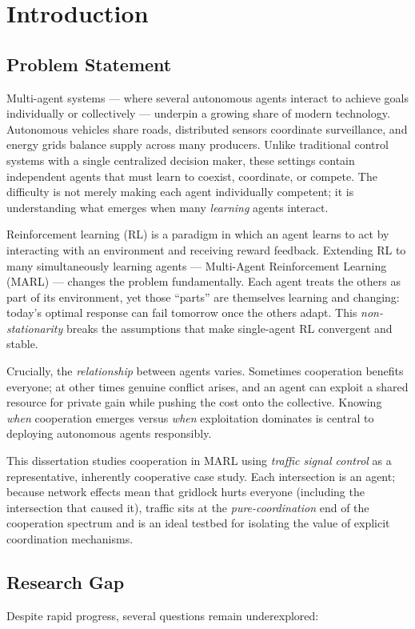\chapter{Introduction}
\label{ch:intro}

\section{Problem Statement}
Multi-agent systems --- where several autonomous agents interact to achieve goals
individually or collectively --- underpin a growing share of modern technology.
Autonomous vehicles share roads, distributed sensors coordinate surveillance, and
energy grids balance supply across many producers. Unlike traditional control
systems with a single centralized decision maker, these settings contain
independent agents that must learn to coexist, coordinate, or compete. The
difficulty is not merely making each agent individually competent; it is
understanding what emerges when many \emph{learning} agents interact.

Reinforcement learning (RL) is a paradigm in which an agent learns to act by
interacting with an environment and receiving reward feedback. Extending RL to
many simultaneously learning agents --- Multi-Agent Reinforcement Learning
(MARL) --- changes the problem fundamentally. Each agent treats the others as part
of its environment, yet those ``parts'' are themselves learning and changing:
today's optimal response can fail tomorrow once the others adapt. This
\emph{non-stationarity} breaks the assumptions that make single-agent RL
convergent and stable.

Crucially, the \emph{relationship} between agents varies. Sometimes cooperation
benefits everyone; at other times genuine conflict arises, and an agent can
exploit a shared resource for private gain while pushing the cost onto the
collective. Knowing \emph{when} cooperation emerges versus \emph{when}
exploitation dominates is central to deploying autonomous agents responsibly.

This dissertation studies cooperation in MARL using \emph{traffic signal control}
as a representative, inherently cooperative case study. Each intersection is an
agent; because network effects mean that gridlock hurts everyone (including the
intersection that caused it), traffic sits at the \emph{pure-coordination} end of
the cooperation spectrum and is an ideal testbed for isolating the value of
explicit coordination mechanisms.

\section{Research Gap}
Despite rapid progress, several questions remain underexplored:

